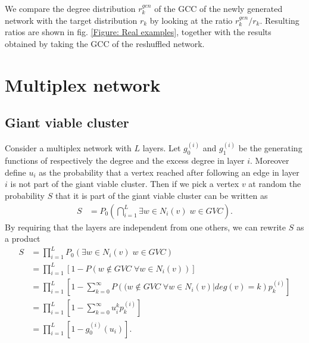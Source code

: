 \documentclass[
11pt, %
english, %
singlespacing, %
nolistspacing, %
liststotoc, %
headsepline, %
]{MastersDoctoralThesis} %
\begin{document}
We compare the degree distribution $r^{gen}_k$ of the GCC of the newly generated network with the target distribution $r_k$ by looking at the ratio $r^{gen}_k / r_k$. Resulting ratios are shown in fig. \ref{Figure: Real examples}, together with the results obtained by taking the GCC of the reshuffled network.


\chapter{Multiplex network}
\label{Section: Multiplex networks}

\section{Giant viable cluster}

Consider a multiplex network with $L$ layers. Let $g_0^{(i)}$ and $g_1^{(i)}$ be the generating functions of respectively the degree and the excess degree in layer $i$. Moreover define $u_i$ as the probability that a vertex reached after following an edge in layer $i$ is not part of the giant viable cluster. Then if we pick a vertex $v$ at random the probability $S$ that it is part of the giant viable cluster can be written as
\begin{align}
	S &= P_0\left(\bigcap_{i = 1}^{L} \exists w \in N_i(v) \; w \in GVC \right).
\end{align}
By requiring that the layers are independent from one others, we can rewrite $S$ as a product
\begin{align}
	S &= \prod_{i = 1}^{L}  P_0\left(\exists w \in N_i(v) \; w \in GVC\right) \\
		&=\prod_{i = 1}^{L}  \left[1 - P\left(w \notin GVC \; \forall w \in N_i(v)\right) \right] \\
		&=\prod_{i = 1}^{L}  \left[1 - \sum_{k = 0}^{\infty} P\left((w \notin GVC \; \forall w \in N_i(v) | deg(v) = k \right) p^{(i)}_k \right] \\
		&=\prod_{i = 1}^{L}  \left[1 - \sum_{k = 0}^{\infty} u_i^k p^{(i)}_k \right] \\
		&=\prod_{i = 1}^{L}  \left[1 - g_0^{(i)}(u_i) \right].\label{Multiplex GCC size final}
\end{align}
\end{document}
